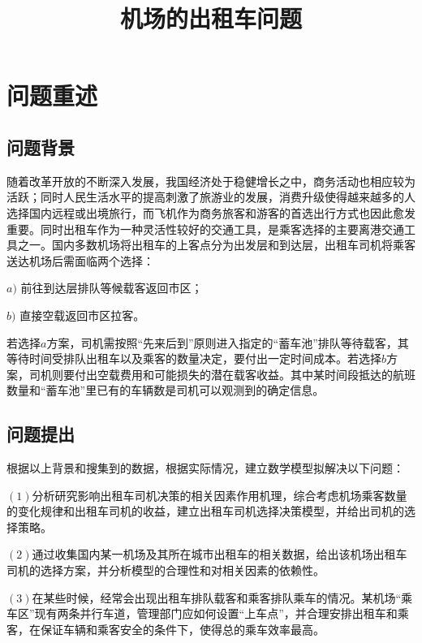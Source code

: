 \documentclass[withoutpreface,bwprint]{cumcmthesis} %
\title{机场的出租车问题}%
\begin{document}
 \maketitle
 \begin{abstract}



\vspace{6cm}
\end{abstract}


\section{问题重述}

\subsection{问题背景}
随着改革开放的不断深入发展，我国经济处于稳健增长之中，商务活动也相应较为活跃；同时人民生活水平的提高刺激了旅游业的发展，消费升级使得越来越多的人选择国内远程或出境旅行，而飞机作为商务旅客和游客的首选出行方式也因此愈发重要。同时出租车作为一种灵活性较好的交通工具，是乘客选择的主要离港交通工具之一。国内多数机场将出租车的上客点分为出发层和到达层，出租车司机将乘客送达机场后需面临两个选择：

$a)$ 前往到达层排队等候载客返回市区；

$b)$ 直接空载返回市区拉客。

若选择$a$方案，司机需按照“先来后到”原则进入指定的“蓄车池”排队等待载客，其等待时间受排队出租车以及乘客的数量决定，要付出一定时间成本。若选择$b$方案，司机则要付出空载费用和可能损失的潜在载客收益。其中某时间段抵达的航班数量和“蓄车池”里已有的车辆数是司机可以观测到的确定信息。


\subsection{问题提出}
根据以上背景和搜集到的数据，根据实际情况，建立数学模型拟解决以下问题：

$(1)$分析研究影响出租车司机决策的相关因素作用机理，综合考虑机场乘客数量的变化规律和出租车司机的收益，建立出租车司机选择决策模型，并给出司机的选择策略。

$(2)$通过收集国内某一机场及其所在城市出租车的相关数据，给出该机场出租车司机的选择方案，并分析模型的合理性和对相关因素的依赖性。


$(3)$在某些时候，经常会出现出租车排队载客和乘客排队乘车的情况。某机场“乘车区”现有两条并行车道，管理部门应如何设置“上车点”，并合理安排出租车和乘客，在保证车辆和乘客安全的条件下，使得总的乘车效率最高。
\end{document}
